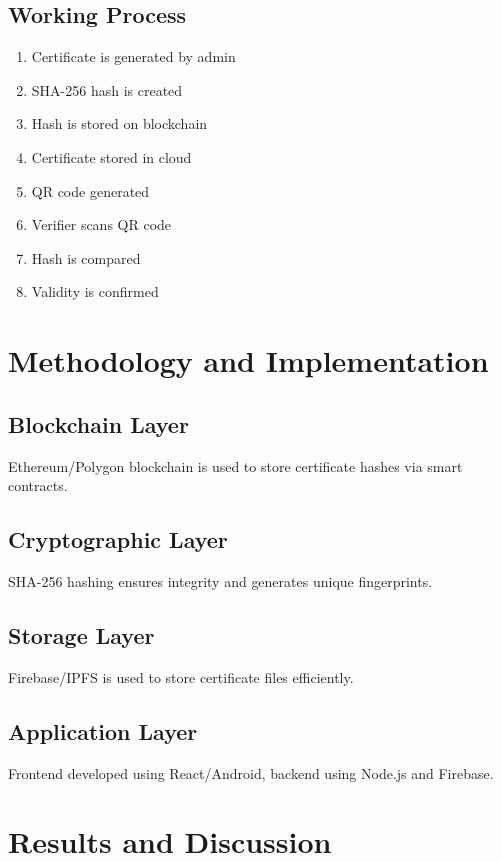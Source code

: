 \documentclass[conference]{IEEEtran}
\begin{document}
\subsection{Working Process}

\begin{enumerate}
\item Certificate is generated by admin
\item SHA-256 hash is created
\item Hash is stored on blockchain
\item Certificate stored in cloud
\item QR code generated
\item Verifier scans QR code
\item Hash is compared
\item Validity is confirmed
\end{enumerate}

\section{Methodology and Implementation}

\subsection{Blockchain Layer}
Ethereum/Polygon blockchain is used to store certificate hashes via smart contracts.

\subsection{Cryptographic Layer}
SHA-256 hashing ensures integrity and generates unique fingerprints.

\subsection{Storage Layer}
Firebase/IPFS is used to store certificate files efficiently.

\subsection{Application Layer}
Frontend developed using React/Android, backend using Node.js and Firebase.

\section{Results and Discussion}
\end{document}
